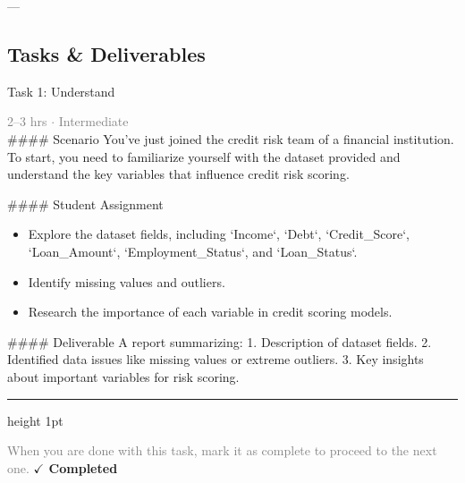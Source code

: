 \documentclass[10pt,a4paper]{article}
\begin{document}
---

\subsection*{Tasks \& Deliverables}

\begin{taskbox}{Task 1: Understand}

    {\small \textcolor{gray}{2--3 hrs $\cdot$ Intermediate}}\\[12pt]

    \#\#\#\# Scenario  
You’ve just joined the credit risk team of a financial institution. To start, you need to familiarize yourself with the dataset provided and understand the key variables that influence credit risk scoring.  

\#\#\#\# Student Assignment  
\begin{itemize}
    \item Explore the dataset fields, including `Income`, `Debt`, `Credit\_Score`, `Loan\_Amount`, `Employment\_Status`, and `Loan\_Status`.  
    \item Identify missing values and outliers.  
    \item Research the importance of each variable in credit scoring models.  
\end{itemize}

\#\#\#\# Deliverable  
A report summarizing:  
1. Description of dataset fields.  
2. Identified data issues like missing values or extreme outliers.  
3. Key insights about important variables for risk scoring.\par

    \vspace{16pt}

    \textcolor{cardBorder}{\hrule height 1pt}\vspace{8pt}

    \small \textcolor{gray}{When you are done with this task, mark it as complete to proceed to the next one.} \hfill \textbf{\textcolor{brandDark}{$\checkmark$ Completed}}

\end{taskbox}
\end{document}
